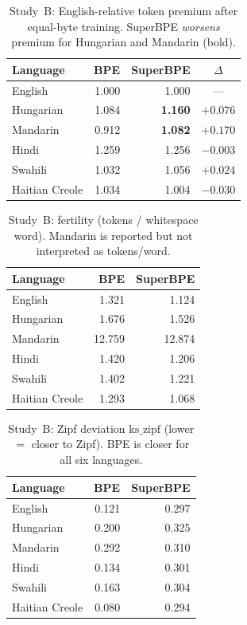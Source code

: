 \documentclass[11pt,a4paper]{article}
\begin{document}
\begin{table}[t]
\centering
\caption{Study~B: English-relative token premium after equal-byte training. SuperBPE \emph{worsens} premium for Hungarian and Mandarin (bold).}
\label{tab:plan-a-premium}
\small
\begin{tabular}{@{}lrrc@{}}
\toprule
Language & BPE & SuperBPE & $\Delta$ \\
\midrule
English           & 1.000 & 1.000 & --- \\
Hungarian         & 1.084 & \textbf{1.160} & $+0.076$ \\
Mandarin          & 0.912 & \textbf{1.082} & $+0.170$ \\
Hindi             & 1.259 & 1.256 & $-0.003$ \\
Swahili           & 1.032 & 1.056 & $+0.024$ \\
Haitian Creole    & 1.034 & 1.004 & $-0.030$ \\
\bottomrule
\end{tabular}
\end{table}

\begin{table}[t]
\centering
\caption{Study~B: fertility (tokens / whitespace word). Mandarin is reported but not interpreted as tokens/word.}
\label{tab:plan-a-fertility}
\small
\begin{tabular}{@{}lrr@{}}
\toprule
Language & BPE & SuperBPE \\
\midrule
English        & 1.321 & 1.124 \\
Hungarian      & 1.676 & 1.526 \\
Mandarin       & 12.759 & 12.874 \\
Hindi          & 1.420 & 1.206 \\
Swahili        & 1.402 & 1.221 \\
Haitian Creole & 1.293 & 1.068 \\
\bottomrule
\end{tabular}
\end{table}

\begin{table}[t]
\centering
\caption{Study~B: Zipf deviation $\mathrm{ks\_zipf}$ (lower $=$ closer to Zipf). BPE is closer for all six languages.}
\label{tab:plan-a-zipf}
\small
\begin{tabular}{@{}lrr@{}}
\toprule
Language & BPE & SuperBPE \\
\midrule
English        & 0.121 & 0.297 \\
Hungarian      & 0.200 & 0.325 \\
Mandarin       & 0.292 & 0.310 \\
Hindi          & 0.134 & 0.301 \\
Swahili        & 0.163 & 0.304 \\
Haitian Creole & 0.080 & 0.294 \\
\bottomrule
\end{tabular}
\end{table}
\end{document}
